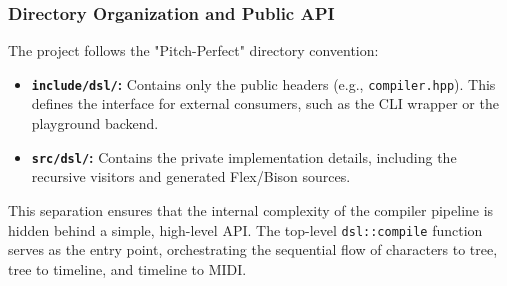 \subsubsection{Directory Organization and Public API}

The project follows the "Pitch-Perfect" directory convention:
\begin{itemize}
    \item \textbf{\texttt{include/dsl/}:} Contains only the public headers (e.g., \texttt{compiler.hpp}). This defines the interface for external consumers, such as the CLI wrapper or the playground backend.
    \item \textbf{\texttt{src/dsl/}:} Contains the private implementation details, including the recursive visitors and generated Flex/Bison sources.
\end{itemize}
This separation ensures that the internal complexity of the compiler pipeline is hidden behind a simple, high-level API.
The top-level \texttt{dsl::compile} function serves as the entry point, orchestrating the sequential flow of characters to tree, tree to timeline, and timeline to MIDI.
